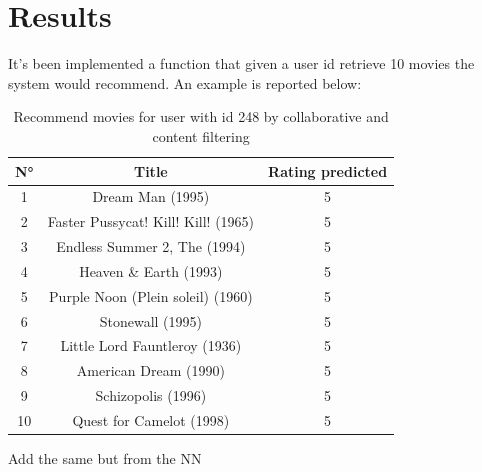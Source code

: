 \documentclass{article}
\begin{document}
\newpage

\section{Results}
It's been implemented a function that given a user id retrieve 10 movies the system would recommend. An example is reported below:

\begin{table}[h]
    \centering
    \begin{tabular}{c|c|c}
        \hline
    \rowcolor{lightgray}N° & Title & Rating predicted\\ 
        \hline
        1 & Dream Man (1995) & 5\\
        \hline
        2 & Faster Pussycat! Kill! Kill! (1965) & 5\\
        \hline
        3 & Endless Summer 2, The (1994) & 5\\
        \hline
        4 & Heaven \& Earth (1993) & 5\\
        \hline
        5 & Purple Noon (Plein soleil) (1960) & 5\\
        \hline
        6 & Stonewall (1995) & 5\\
        \hline
        7 & Little Lord Fauntleroy (1936) & 5\\
        \hline
        8 & American Dream (1990) & 5\\
        \hline
        9 & Schizopolis (1996) & 5\\
        \hline
        10 & Quest for Camelot (1998) & 5\\
        \hline
    \end{tabular}
    \caption{Recommend movies for user with id 248 by collaborative and content filtering}
    \label{tab:recommendedMovie1}
\end{table}

Add the same but from the NN
\end{document}

